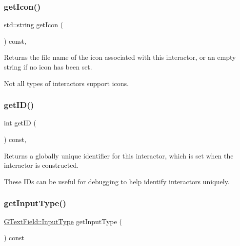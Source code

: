 \subsubsection{\texorpdfstring{get\+Icon()}{getIcon()}}
{\footnotesize\ttfamily std\+::string get\+Icon (\begin{DoxyParamCaption}{ }\end{DoxyParamCaption}) const\hspace{0.3cm}{\ttfamily [virtual]}, {\ttfamily [inherited]}}



Returns the file name of the icon associated with this interactor, or an empty string if no icon has been set. 

Not all types of interactors support icons. \mbox{\label{classsgl_1_1GInteractor_a9c9659a6c6ba66b4107ba59c95a24241}} 
\subsubsection{\texorpdfstring{get\+I\+D()}{getID()}}
{\footnotesize\ttfamily int get\+ID (\begin{DoxyParamCaption}{ }\end{DoxyParamCaption}) const\hspace{0.3cm}{\ttfamily [virtual]}, {\ttfamily [inherited]}}



Returns a globally unique identifier for this interactor, which is set when the interactor is constructed. 

These I\+Ds can be useful for debugging to help identify interactors uniquely. \mbox{\label{classsgl_1_1GTextField_a69cc7c223d780203ab2852ee5a881753}} 
\subsubsection{\texorpdfstring{get\+Input\+Type()}{getInputType()}}
{\footnotesize\ttfamily \mbox{\hyperlink{classsgl_1_1GTextField_a5fc772c800c3d40d2b95564e8a839bab}{G\+Text\+Field\+::\+Input\+Type}} get\+Input\+Type (\begin{DoxyParamCaption}{ }\end{DoxyParamCaption}) const\hspace{0.3cm}{\ttfamily [virtual]}}




